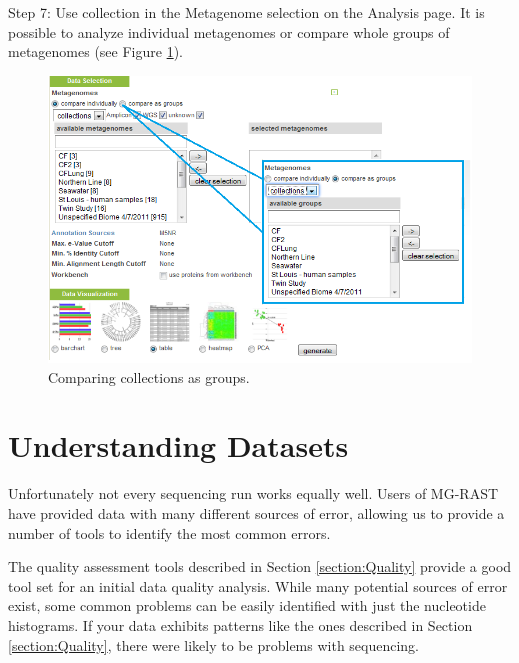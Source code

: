 \documentclass[12pt,fullpage]{report}
\begin{document}
Step 7: Use collection in the Metagenome selection on the Analysis page. It is possible to analyze individual metagenomes or compare whole groups of metagenomes (see Figure \ref{fig:using-collections}).

\begin{figure}[ht]
\begin{center}
\includegraphics[width=6in]{Images/using-collections.png}
\end{center}
\caption{
Comparing collections as groups.}
\label{fig:using-collections}
\end{figure}
\section{Understanding Datasets}
Unfortunately not every sequencing run works equally well. Users of MG-RAST have provided data with
many different sources of error, allowing us to provide a number of tools to identify the most common errors.

The quality assessment tools described in Section \ref{section:Quality} provide a good tool set for an initial data quality analysis. While many potential sources of error exist, some common problems can be easily identified with just the nucleotide histograms. If your data exhibits patterns like the ones described in Section \ref{section:Quality}, there were likely to be problems with sequencing.
\end{document}
